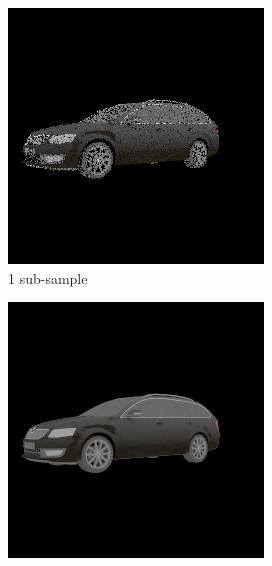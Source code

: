 \begin{figure}
    \centering
    \caption{Monte-Carlo sub-sampling per pixel has a huge effect on the resultant render.
        Training the model using a low Monte-Carlo sub-sampling rate causes the discriminator
        to \emph{mode collapse} due to the discrepancy in render quality.}
    \label{fig:monte-carlo}
    \vspace{0.2in}
    \begin{subfigure}[t]{0.32\linewidth}
        \centering
        \includegraphics[width=\linewidth]{graphics/mc1.png}
        \caption{1 sub-sample}
    \end{subfigure}
    \begin{subfigure}[t]{0.32\linewidth}
        \centering
        \includegraphics[width=\linewidth]{graphics/mc200.png}

\end{subfigure}
\end{figure}
